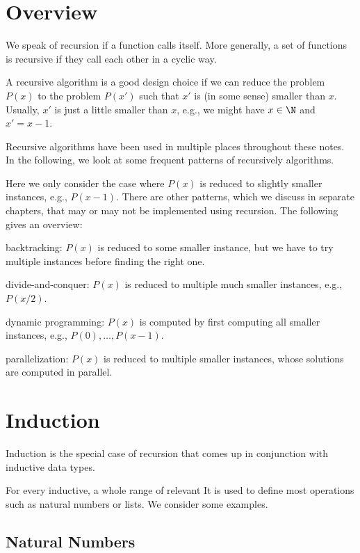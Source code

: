 \section{Overview}

We speak of recursion if a function calls itself.
More generally, a set of functions is recursive if they call each other in a cyclic way.

A recursive algorithm is a good design choice if we can reduce the problem $P(x)$ to the problem $P(x')$ such that $x'$ is (in some sense) smaller than $x$.
Usually, $x'$ is just a little smaller than $x$, e.g., we might have $x\in\N$ and $x'=x-1$.

Recursive algorithms have been used in multiple places throughout these notes.
In the following, we look at some frequent patterns of recursively algorithms.

Here we only consider the case where $P(x)$ is reduced to slightly smaller instances, e.g., $P(x-1)$.
There are other patterns, which we discuss in separate chapters, that may or may not be implemented using recursion.
The following gives an overview:
\begin{compactitem}
  \item backtracking: $P(x)$ is reduced to some smaller instance, but we have to try multiple instances before finding the right one.
  \item divide-and-conquer: $P(x)$ is reduced to multiple much smaller instances, e.g., $P(x/2)$.
  \item dynamic programming: $P(x)$ is computed by first computing all smaller instances, e.g., $P(0),\ldots,P(x-1)$.
  \item parallelization: $P(x)$ is reduced to multiple smaller instances, whose solutions are computed in parallel.
\end{compactitem}

\section{Induction}

Induction is the special case of recursion that comes up in conjunction with inductive data types.

For every inductive, a whole range of relevant It is used to define most operations  such as natural numbers or lists.
We consider some examples.

\subsection{Natural Numbers}

